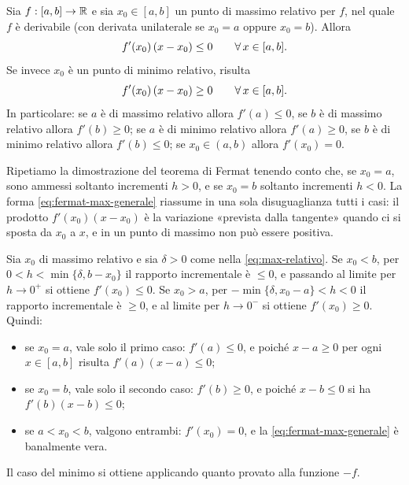 \begin{proposizione}\label{prop:fermat-estremi}
Sia $f:[a,b]\to\mathbb{R}$ e sia $x_{0}\in[a,b]$ un punto di massimo relativo per $f$, nel quale
$f$ è derivabile (con derivata unilaterale se $x_{0}=a$ oppure $x_{0}=b$). Allora
\begin{equation}\label{eq:fermat-max-generale}
  f'(x_{0})\,(x-x_{0})\le0 \qquad\forall\, x\in[a,b].
\end{equation}
Se invece $x_{0}$ è un punto di minimo relativo, risulta
\begin{equation}\label{eq:fermat-min-generale}
  f'(x_{0})\,(x-x_{0})\ge0 \qquad\forall\, x\in[a,b].
\end{equation}
In particolare: se $a$ è di massimo relativo allora $f'(a)\le0$, se $b$ è di massimo
relativo allora $f'(b)\ge0$; se $a$ è di minimo relativo allora $f'(a)\ge0$, se $b$ è di
minimo relativo allora $f'(b)\le0$; se $x_{0}\in(a,b)$ allora $f'(x_{0})=0$.
\end{proposizione}

\begin{schema}
\end{schema}

\begin{strategia}
Ripetiamo la dimostrazione del teorema di Fermat tenendo conto che, se $x_{0}=a$, sono
ammessi soltanto incrementi $h>0$, e se $x_{0}=b$ soltanto incrementi $h<0$. La forma
\eqref{eq:fermat-max-generale} riassume in una sola disuguaglianza tutti i casi: il
prodotto $f'(x_{0})(x-x_{0})$ è la variazione «prevista dalla tangente» quando ci si
sposta da $x_{0}$ a $x$, e in un punto di massimo non può essere positiva.
\end{strategia}

\begin{dimostrazione}
Sia $x_{0}$ di massimo relativo e sia $\delta>0$ come nella \eqref{eq:max-relativo}.
Se $x_{0}<b$, per $0<h<\min\{\delta,b-x_{0}\}$ il rapporto incrementale è $\le0$, e
passando al limite per $h\to0^{+}$ si ottiene $f'(x_{0})\le0$. Se $x_{0}>a$, per
$-\min\{\delta,x_{0}-a\}<h<0$ il rapporto incrementale è $\ge0$, e al limite per
$h\to0^{-}$ si ottiene $f'(x_{0})\ge0$. Quindi:
\begin{itemize}
  \item se $x_{0}=a$, vale solo il primo caso: $f'(a)\le0$, e poiché $x-a\ge0$ per ogni
  $x\in[a,b]$ risulta $f'(a)(x-a)\le0$;
  \item se $x_{0}=b$, vale solo il secondo caso: $f'(b)\ge0$, e poiché $x-b\le0$ si ha
  $f'(b)(x-b)\le0$;
  \item se $a<x_{0}<b$, valgono entrambi: $f'(x_{0})=0$, e la
  \eqref{eq:fermat-max-generale} è banalmente vera.
\end{itemize}
Il caso del minimo si ottiene applicando quanto provato alla funzione $-f$.
\end{dimostrazione}


